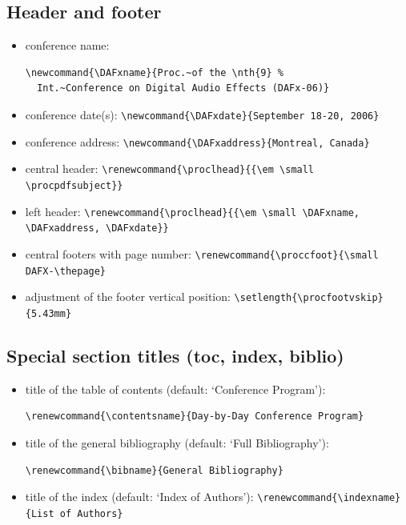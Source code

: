 \documentclass{article}
\begin{document}

\subsection{Header and footer}\label{sec:custom:header:footer}

\begin{itemize}
  \item conference name: 
\begin{verbatim}
\newcommand{\DAFxname}{Proc.~of the \nth{9} %
  Int.~Conference on Digital Audio Effects (DAFx-06)}
\end{verbatim}
  \item conference date(s): \verb+\newcommand{\DAFxdate}{September 18-20, 2006}+
  \item conference address: \verb+\newcommand{\DAFxaddress}{Montreal, Canada}+
  \item central header: \verb+\renewcommand{\proclhead}{{\em \small \procpdfsubject}}+
  \item left header: \verb+\renewcommand{\proclhead}{{\em \small \DAFxname, \DAFxaddress, \DAFxdate}}+
  \item central footers with page number:  \verb+\renewcommand{\proccfoot}{\small DAFX-\thepage}+
  \item adjustment of the footer vertical position: \verb+\setlength{\procfootvskip}{5.43mm}+
\end{itemize}

\subsection{Special section titles (toc, index, biblio)}

\begin{itemize}
  \item title of the table of contents (default: `Conference Program'):
\begin{verbatim}
\renewcommand{\contentsname}{Day-by-Day Conference Program}
\end{verbatim}
  \item title of the general bibliography (default: `Full Bibliography'):
\begin{verbatim}
\renewcommand{\bibname}{General Bibliography}
\end{verbatim}
  \item title of the index (default: `Index of Authors'): \verb+\renewcommand{\indexname}{List of Authors}+
\end{itemize}
\end{document}
